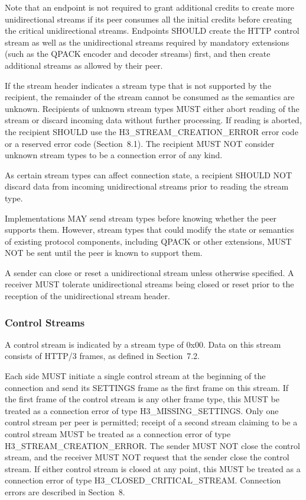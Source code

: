 \documentclass{article}
\begin{document}
Note that an endpoint is not required to grant additional credits to create more unidirectional streams if its peer consumes all the initial credits before creating the critical unidirectional streams. Endpoints SHOULD create the HTTP control stream as well as the unidirectional streams required by mandatory extensions (such as the QPACK encoder and decoder streams) first, and then create additional streams as allowed by their peer.

If the stream header indicates a stream type that is not supported by the recipient, the remainder of the stream cannot be consumed as the semantics are unknown.  Recipients of unknown stream types MUST either abort reading of the stream or discard incoming data without further processing.  If reading is aborted, the recipient SHOULD use the H3\_STREAM\_CREATION\_ERROR error code or a reserved error code (Section~8.1).  The recipient MUST NOT consider unknown stream types to be a connection error of any kind.

As certain stream types can affect connection state, a recipient SHOULD NOT discard data from incoming unidirectional streams prior to reading the stream type.

Implementations MAY send stream types before knowing whether the peer supports them.  However, stream types that could modify the state or semantics of existing protocol components, including QPACK or other extensions, MUST NOT be sent until the peer is known to support them.

A sender can close or reset a unidirectional stream unless otherwise specified.  A receiver MUST tolerate unidirectional streams being closed or reset prior to the reception of the unidirectional stream header.

\subsubsection{Control Streams}

A control stream is indicated by a stream type of 0x00.  Data on this stream consists of HTTP/3 frames, as defined in Section~7.2.

Each side MUST initiate a single control stream at the beginning of the connection and send its SETTINGS frame as the first frame on this stream.  If the first frame of the control stream is any other frame type, this MUST be treated as a connection error of type H3\_MISSING\_SETTINGS.  Only one control stream per peer is permitted; receipt of a second stream claiming to be a control stream MUST be treated as a connection error of type H3\_STREAM\_CREATION\_ERROR.  The sender MUST NOT close the control stream, and the receiver MUST NOT request that the sender close the control stream.  If either control stream is closed at any point, this MUST be treated as a connection error of type H3\_CLOSED\_CRITICAL\_STREAM.  Connection errors are described in Section~8.
\end{document}
